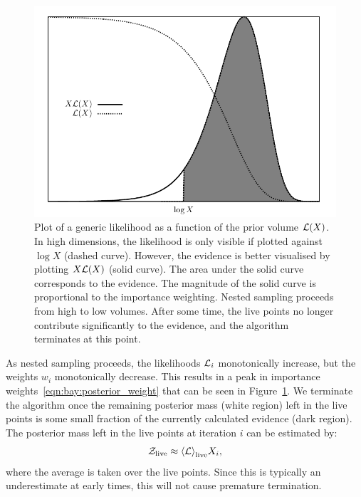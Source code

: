 %
\begin{figure}[tp]
  \centering
  \includegraphics[width=\columnwidth]{chapters/bayesian_inference/figures/gaussian_weight}
  \caption{%
    Plot of a generic likelihood as a function of the prior volume \(\mathcal{L}(X)\). In high dimensions, the likelihood is only visible if plotted against \(\log X\) (dashed curve). However, the evidence is better visualised by plotting \(X\mathcal{L}(X)\) (solid curve). The area under the solid curve corresponds to the evidence. The magnitude of the solid curve is proportional to the importance weighting. Nested sampling proceeds from high to low volumes. After some time, the live points no longer contribute significantly to the evidence, and the algorithm terminates at this point.\label{fig:bay:gaussian_weight}
  }
\end{figure}
%
As nested sampling proceeds, the likelihoods \(\mathcal{L}_i\) monotonically increase, but the weights \(w_i\) monotonically decrease. This results in a peak in importance weights~\eqref{eqn:bay:posterior_weight} that can be seen in Figure~\ref{fig:bay:gaussian_weight}. We terminate the algorithm once the remaining posterior mass (white region) left in the live points is some small fraction of the currently calculated evidence (dark region). The posterior mass left in the live points at iteration \(i\) can be estimated by:
\begin{equation}
  \mathcal{Z}_{\mathrm{live}} \approx {\left\langle{\mathcal{L}}\right\rangle}_{\mathrm{live}} X_i,
  \label{eqn:bay:live_evidence}
\end{equation}
where the average is taken over the live points. Since this is typically an underestimate at early times, this will not cause premature termination.



